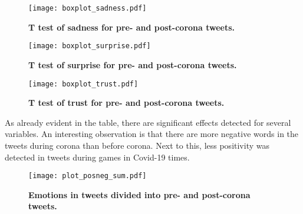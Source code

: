 \documentclass[12pt]{article}
\begin{document}
\begin{figure}[H]
\caption{\textbf{T test of sadness for pre- and post-corona tweets.}}
\texttt{[image: boxplot\_sadness.pdf]}

\end{figure}

\begin{figure}[H]
\caption{\textbf{T test of surprise for pre- and post-corona tweets.}}
\texttt{[image: boxplot\_surprise.pdf]}

\end{figure}

\begin{figure}[H]
\caption{\textbf{T test of trust for pre- and post-corona tweets.}}
\texttt{[image: boxplot\_trust.pdf]}

\end{figure}
As already evident in the table, there are significant effects detected for several variables. An interesting observation is that there are more negative words in the tweets during corona than before corona. Next to this, less positivity was detected in tweets during games in Covid-19 times.

\begin{figure}[H]
\caption{\textbf{Emotions in tweets divided into pre- and post-corona tweets.}}
\texttt{[image: plot\_posneg\_sum.pdf]}

\end{figure}


\nocite{*}

\end{document}
